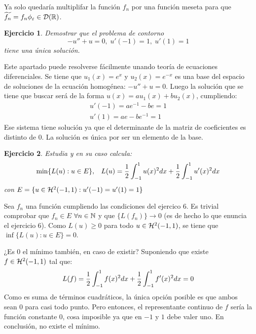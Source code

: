 \documentclass[12pt]{article}
\newtheorem{ejercicio}{Ejercicio}
\theoremstyle{definition}
\theoremstyle{remark}
\begin{document}
Ya solo quedaría multiplifar la función $f_n$ por una función meseta para que $\widetilde{f_n}=f_n\phi_\varepsilon\in\mathcal{D}(\R)$.


\begin{ejercicio}
Demostrar que el problema de contorno
\[
-u''+u=0, \; u'(-1)=1, \; u'(1)=1
\]
tiene una única solución.
\end{ejercicio}

Este apartado puede resolverse fácilmente unando teoría de ecuaciones diferenciales. Se tiene que $u_1(x)=e^x$ y $u_2(x)=e^{-x}$ es una base del espacio de soluciones de la ecuación homogénea: $-u''+u=0$. Luego la solución que se tiene que buscar será de la forma $u(x)=au_1(x)+bu_2(x)$, cumpliendo:
\[
\begin{array}{l}
u'(-1)=ae^{-1}-be=1\\
u'(1)=ae-be^{-1}=1
\end{array}
\]
Ese sistema tiene solución ya que el determinante de la matriz de coeficientes es distinto de 0. La solución es única por ser un elemento de la base.


\begin{ejercicio}
Estudia y en su caso calcula:
\[
\min\{L(u):u\in E\}, \espacio L(u)=\frac{1}{2}\integral{-1}{1}{u(x)^2dx}+\frac{1}{2}\integral{-1}{1}{u'(x)^2dx}
\]
con $E=\{u\in\sobolev[-1,1]{2}: u'(-1)=u'(1)=1\}$
\end{ejercicio}

Sea $f_n$ una función cumpliendo las condiciones del ejercico 6. Es trivial comprobar que $f_n\in E$ $\forall n\in\N$ y que $\{L(f_n)\}\longrightarrow 0$ (es de hecho lo que enuncia el ejercicio 6). Como $L(u)\geq 0$ para todo $u\in\sobolev[-1,1]{2}$, se tiene que $\inf\{L(u):u\in E\}=0$. 

¿Es 0 el mínimo también, en caso de existir? Suponiendo que existe $f\in\sobolev[-1,1]{2}$ tal que:
\[
L(f)=\frac{1}{2}\integral{-1}{1}{f(x)^2dx}+\frac{1}{2}\integral{-1}{1}{f'(x)^2dx}=0
\]
Como es suma de términos cuadráticos, la única opción posible es que ambos sean 0 para casi todo punto. Pero entonces, el representante continuo de $f$ sería la función constante 0, cosa imposible ya que en $-1$ y $1$ debe valer uno. En conclusión, no existe el mínimo.
\end{document}
